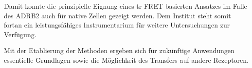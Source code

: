  Damit konnte die prinzipielle Eignung eines tr-FRET basierten Ansatzes im Falle des ADRB2 auch für native Zellen gezeigt werden. Dem Institut steht somit fortan ein leistungsfähiges Instrumentarium für weitere Untersuchungen zur Verfügung.
 
 Mit der Etablierung der Methoden ergeben sich für zukünftige Anwendungen essentielle Grundlagen sowie die Möglichkeit des Transfers auf andere Rezeptoren.
